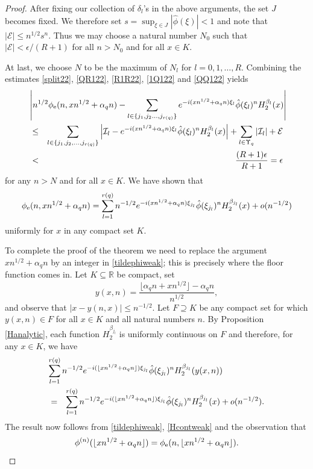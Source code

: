 \documentclass{article}
\theoremstyle{theorem}
\theoremstyle{remark}
\begin{document}
\begin{proof}
After fixing our collection of $\delta_l$'s in the above arguments, the set $J$ becomes fixed. We therefore set $s=\sup_{\xi\in J}|\hat{\phi}(\xi)|<1$ and note that $|\mathcal{E}|\leq
n^{1/2}s^n$. Thus we may choose a natural number $N_0$ such that $|\mathcal{E}|<\epsilon/(R+1)$ for all $n>N_0$ and for all $x\in K$.

At last, we choose $N$ to be the maximum of $N_l$ for $l=0,1,\dots, R$. Combining the estimates \eqref{split22}, \eqref{QR122}, \eqref{R1R22}, \eqref{1Q122} and \eqref{QQ122} yields
\begin{eqnarray*}
 \lefteqn{\left|n^{1/2}\phi_{\mbox{\scriptsize{e}}}(n,xn^{1/2}+\alpha_q n)-\sum_{l\in\{j_1,j_2\dots,j_{r(q)}\}}e^{-i(xn^{1/2}+\alpha_q
n)\xi_l}\hat{\phi}(\xi_l)^n H_2^{\beta_l}(x)\right|}\\
&\leq&\sum_{l\in\{j_1,j_2,\dots,j_{r(q)}\}}\left|\mathcal{I}_l-e^{-i(xn^{1/2}+\alpha_q
n)\xi_l}\hat{\phi}(\xi_l)^n H_2^{\beta_l}(x)\right|+\sum_{l\in\Upsilon_q}|\mathcal{I}_l|+\mathcal{E}\\
&<& \frac{(R+1)\epsilon}{R+1}=\epsilon
\end{eqnarray*}
for any $n>N$ and for all $x\in K$. We have shown that
\begin{equation}\label{tildephiweak}
\phi_{\mbox{\scriptsize{e}}}(n, xn^{1/2}+\alpha_q n)=\sum_{l=1}^{r(q)}n^{-1/2}e^{-i( xn^{1/2}+\alpha_q
n) \xi_{j_l}}\hat{\phi}(\xi_{j_l})^n H_2^{\beta_{j_l}}(x)+o(n^{-1/2})
\end{equation}
uniformly for $x$ in any compact set $K$. 

To complete the proof of the theorem we need to replace the argument $xn^{1/2}+\alpha_q
n$ by an integer in \eqref{tildephiweak}; this is precisely where the floor function comes in. Let $K\subseteq \mathbb{R}$ be compact, set 
\begin{equation*}
y(x,n)=\frac{\lfloor \alpha_q n+xn^{1/2}\rfloor-\alpha_q n}{n^{1/2}},
\end{equation*}
and observe that $|x-y(n,x)|\leq n^{-1/2}$. Let $F\supseteq K$ be any compact set for which $y(x,n)\in F$ for all $x\in K$ and all natural numbers $n$. By Proposition \ref{Hanalytic}, each function $H_2^{\beta_{j_l}}$  is uniformly continuous on $F$ and therefore, for any $x\in K$, we have
\begin{eqnarray}\label{Hcontweak}\nonumber
\lefteqn{\sum_{l=1}^{r(q)}n^{-1/2}e^{-i( \lfloor xn^{1/2}+\alpha_q
n\rfloor) \xi_{j_l}}\hat{\phi}(\xi_{j_l})^n H_2^{\beta_{j_l}}(y(x,n))}\\
&=&\sum_{l=1}^{r(q)}n^{-1/2}e^{-i( \lfloor xn^{1/2}+\alpha_q
n\rfloor) \xi_{j_l}}\hat{\phi}(\xi_{j_l})^n H_2^{\beta_{j_l}}(x)+o(n^{-1/2}).
\end{eqnarray}
The result now follows from \eqref{tildephiweak}, \eqref{Hcontweak}  and the observation that 
\begin{equation*}
 \phi^{(n)}(\lfloor xn^{1/2}+\alpha_q
n\rfloor)=\phi_{\mbox{\scriptsize{e}}}(n,\lfloor xn^{1/2}+\alpha_q n\rfloor).
\end{equation*}
\end{proof}
\end{document}

